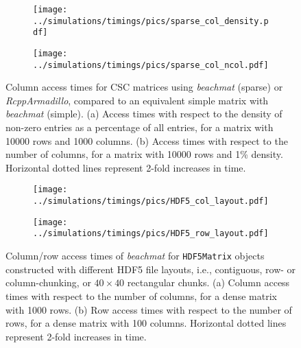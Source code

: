 \documentclass{article}
\newcommand{\beachmat}{\textit{beachmat}}
\newcommand{\code}[1]{\texttt{#1}}
\begin{document}
\begin{figure}[bt]
    \centering
    \begin{subfigure}[b]{0.49\textwidth}
        \texttt{[image: ../simulations/timings/pics/sparse\_col\_density.pdf]}
        \caption{}
    \end{subfigure}
    \begin{subfigure}[b]{0.49\textwidth}
        \texttt{[image: ../simulations/timings/pics/sparse\_col\_ncol.pdf]}
        \caption{}
    \end{subfigure}
    \caption{Column access times for CSC matrices using \beachmat{} (sparse) or \textit{RcppArmadillo}, compared to an equivalent simple matrix with \beachmat{} (simple).
        (a) Access times with respect to the density of non-zero entries as a percentage of all entries, for a matrix with 10000 rows and 1000 columns.
        (b) Access times with respect to the number of columns, for a matrix with 10000 rows and 1\% density.
        Horizontal dotted lines represent 2-fold increases in time.
    }
    \label{fig:sparsecol}
\end{figure}

\begin{figure}[bt]
    \begin{subfigure}[b]{0.49\textwidth}
        \texttt{[image: ../simulations/timings/pics/HDF5\_col\_layout.pdf]}
        \caption{}
    \end{subfigure}
    \begin{subfigure}[b]{0.49\textwidth}
        \texttt{[image: ../simulations/timings/pics/HDF5\_row\_layout.pdf]}
        \caption{}
    \end{subfigure}
    \caption{Column/row access times of \beachmat{} for \code{HDF5Matrix} objects constructed with different HDF5 file layouts, 
        i.e., contiguous, row- or column-chunking, or $40\times40$ rectangular chunks.
        (a) Column access times with respect to the number of columns, for a dense matrix with 1000 rows.
        (b) Row access times with respect to the number of rows, for a dense matrix with 100 columns.
        Horizontal dotted lines represent 2-fold increases in time.
    }
    \label{fig:hdf5layout}
\end{figure}
\end{document}
